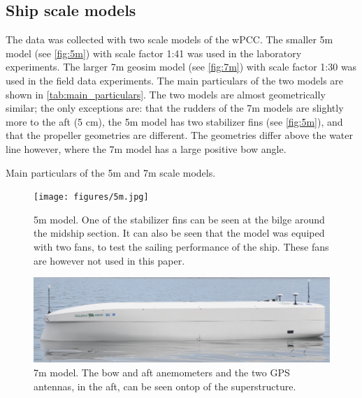 \subsection{Ship scale models}
\label{sec:ship_scale_models}
The data was collected with two scale models of the wPCC. The smaller 5m model (see \autoref{fig:5m}) with scale factor 1:41 was used in the laboratory experiments. The larger 7m geosim model (see \autoref{fig:7m}) with scale factor 1:30 was used in the field data experiments. The main particulars of the two models are shown in \autoref{tab:main_particulars}. The two models are almost geometrically similar; the only exceptions are: that the rudders of the 7m models are slightly more to the aft (5 cm), the 5m model has two stabilizer fins (see \autoref{fig:5m}), and that the propeller geometries are different. The geometries differ above the water line however, where the 7m model has a large positive bow angle.
\begin{table}[!ht]
    \centering
    \caption{Main particulars of the 5m and 7m scale models.}
    \label{tab:main_particulars}
\end{table}
\begin{figure}[!ht]
    \texttt{[image: figures/5m.jpg]}
    \caption{5m model. One of the stabilizer fins can be seen at the bilge around the midship section. It can also be seen that the model was equiped with two fans, to test the sailing performance of the ship. These fans are however not used in this paper.}
    \label{fig:5m}
\end{figure}
\begin{figure}[!ht]
    \includegraphics[width=\textwidth]{figures/7m.jpg}
    \caption{7m model. The bow and aft anemometers and the two GPS antennas, in the aft, can be seen ontop of the superstructure.}
    \label{fig:7m}
\end{figure}